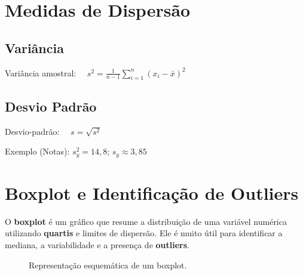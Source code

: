 \section{Medidas de Dispersão}

\subsection*{Variância}
\begin{FormulaBox}
Variância amostral: $\quad s^2 = \frac{1}{n-1}\sum_{i=1}^{n}(x_i - \bar{x})^2$
\end{FormulaBox}

\subsection*{Desvio Padrão}
\begin{FormulaBox}
Desvio-padrão: $\quad s = \sqrt{s^2}$
\end{FormulaBox}

Exemplo (Notas):  
$s_y^2 = 14{,}8$; \quad $s_y \approx 3{,}85$

\section{Boxplot e Identificação de Outliers}

O \textbf{boxplot} é um gráfico que resume a distribuição de uma variável numérica utilizando \textbf{quartis} e limites de dispersão.  
Ele é muito útil para identificar a mediana, a variabilidade e a presença de \textbf{outliers}.

\begin{figure}[H]
\centering
{}
\caption{Representação esquemática de um boxplot.}
\end{figure}

